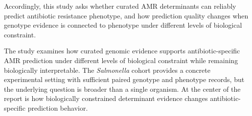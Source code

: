 Accordingly, this study asks whether curated AMR determinants can reliably predict antibiotic resistance phenotype, and how prediction quality changes when genotype evidence is connected to phenotype under different levels of biological constraint.

The study examines how curated genomic evidence supports antibiotic-specific AMR prediction under different levels of biological constraint while remaining biologically interpretable. The \textit{Salmonella} cohort provides a concrete experimental setting with sufficient paired genotype and phenotype records, but the underlying question is broader than a single organism. At the center of the report is how biologically constrained determinant evidence changes antibiotic-specific prediction behavior.
